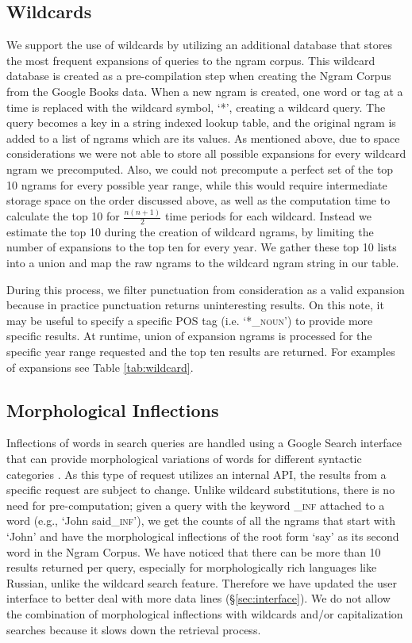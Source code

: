 \documentclass[11pt,a4paper]{article}
\begin{document}
\subsection{Wildcards}
\label{sec:wildcards}
	We support the use of wildcards by utilizing an additional database that stores the most frequent expansions of queries to the ngram corpus. This wildcard database is created as a pre-compilation step when creating the Ngram Corpus from the Google Books data. When a new ngram is created, one word or tag at a time is replaced with the wildcard symbol, `*', creating a wildcard query. The query becomes a key in a string indexed lookup table, and the original ngram is added to a list of ngrams which are its values. As mentioned above, due to space considerations we were not able to store all possible expansions for every wildcard ngram we precomputed. Also, we could not precompute a perfect set of the top 10 ngrams for every possible year range, while this would require intermediate storage space on the order discussed above, as well as the computation time to calculate the top 10 for $\frac{n(n+1)}{2}$ time periods for each wildcard. Instead we estimate the top 10 during the creation of wildcard ngrams, by limiting the number of expansions to the top ten for every year. We gather these top 10 lists into a union and map the raw ngrams to the wildcard ngram string in our table. 
	
	During this process, we filter punctuation from consideration as a valid expansion because in practice punctuation returns uninteresting results. On this note, it may be useful to specify a specific POS tag (i.e. `*\textsf{\textsc{\_noun}}') to provide more specific results. At runtime, union of expansion ngrams is processed for the specific year range requested and the top ten results are returned. For examples of expansions see Table \ref{tab:wildcard}. 


\subsection{Morphological Inflections}
Inflections of words in search queries are handled using a Google Search interface that can provide morphological variations of words for different syntactic categories \cite{durrett2013supervised}. As this type of request utilizes an internal API, the results from a specific request are subject to change. Unlike wildcard substitutions, there is no need for pre-computation; given a query with the keyword \textsf{\textsc{\_inf}} attached to a word (e.g., `John said\textsf{\textsc{\_inf}}'), we get the counts of all the ngrams that start with `John' and have the morphological inflections of the root form `say' as its second word in the Ngram Corpus. We have noticed that there can be more than 10 results returned per query, especially for morphologically rich languages like Russian, unlike the wildcard search feature. Therefore we have updated the user interface to better deal with more data lines (\S\ref{sec:interface}). We do not allow the combination of morphological inflections with wildcards and/or capitalization searches
because it slows down the retrieval process.
\end{document}
